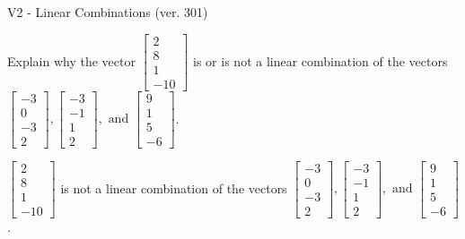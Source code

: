 \begin{exercise}
  \begin{exerciseTitle}V2 - Linear Combinations (ver. 301)\end{exerciseTitle}
  \begin{exerciseStatement}
    Explain why the vector \(\left[\begin{array}{c}
2 \\
8 \\
1 \\
-10
\end{array}\right]\)  is or is not a linear 
	combination of the vectors \(\left[\begin{array}{c}
-3 \\
0 \\
-3 \\
2
\end{array}\right] , \left[\begin{array}{c}
-3 \\
-1 \\
1 \\
2
\end{array}\right] , \text{ and } \left[\begin{array}{c}
9 \\
1 \\
5 \\
-6
\end{array}\right]\).
	


  \end{exerciseStatement}
  \begin{exerciseAnswer}
   \(\left[\begin{array}{c}
2 \\
8 \\
1 \\
-10
\end{array}\right]\) 
  	 is not  
	a linear combination of the vectors \(\left[\begin{array}{c}
-3 \\
0 \\
-3 \\
2
\end{array}\right] , \left[\begin{array}{c}
-3 \\
-1 \\
1 \\
2
\end{array}\right] , \text{ and } \left[\begin{array}{c}
9 \\
1 \\
5 \\
-6
\end{array}\right]\).

	
  


  \end{exerciseAnswer}
\end{exercise}